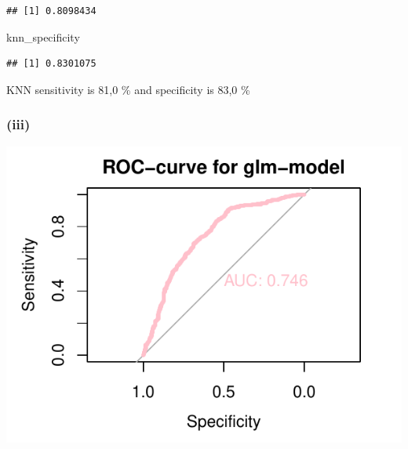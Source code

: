 \documentclass[
]{article}
\newenvironment{Shaded}{\begin{snugshade}}{\end{snugshade}}
\newcommand{\AttributeTok}[1]{\textcolor[rgb]{0.77,0.63,0.00}{#1}}
\newcommand{\ConstantTok}[1]{\textcolor[rgb]{0.00,0.00,0.00}{#1}}
\newcommand{\DecValTok}[1]{\textcolor[rgb]{0.00,0.00,0.81}{#1}}
\newcommand{\FunctionTok}[1]{\textcolor[rgb]{0.00,0.00,0.00}{#1}}
\newcommand{\NormalTok}[1]{#1}
\newcommand{\OtherTok}[1]{\textcolor[rgb]{0.56,0.35,0.01}{#1}}
\newcommand{\SpecialCharTok}[1]{\textcolor[rgb]{0.00,0.00,0.00}{#1}}
\newcommand{\StringTok}[1]{\textcolor[rgb]{0.31,0.60,0.02}{#1}}
\begin{document}
\begin{verbatim}
## [1] 0.8098434
\end{verbatim}

\begin{Shaded}
\begin{Highlighting}[]
\NormalTok{knn\_specificity}
\end{Highlighting}
\end{Shaded}

\begin{verbatim}
## [1] 0.8301075
\end{verbatim}

KNN sensitivity is 81,0 \% and specificity is 83,0 \%

\hypertarget{iii}{%
\subsubsection{(iii)}\label{iii}}

\begin{Shaded}
\end{Shaded}

\begin{center}\includegraphics{Exercise1_files/figure-latex/unnamed-chunk-19-1} \end{center}
\end{document}
